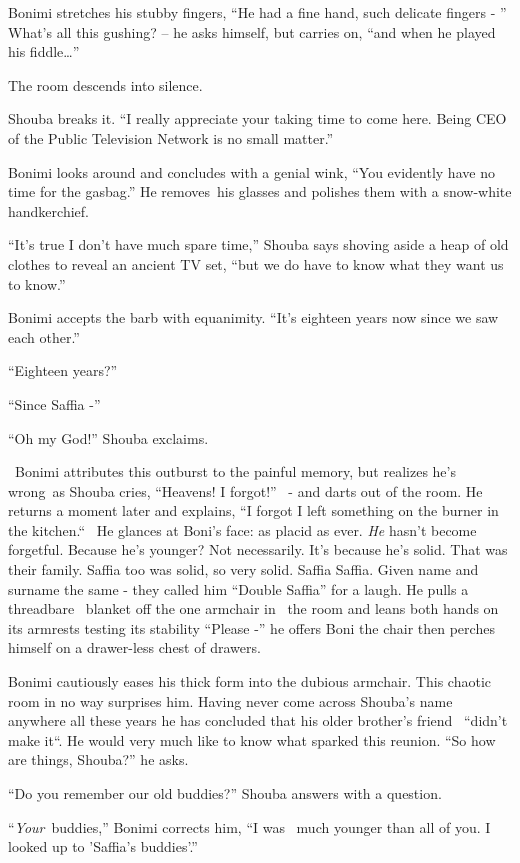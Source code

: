 \documentclass[twoside,11pt]{book}
\begin{document}
Bonimi stretches his stubby fingers, ``He had a fine hand, such delicate fingers - '' What's
all this gushing? -- he asks himself, but carries on, ``and when he played his
fiddle{\dots}''

The room descends into silence.

Shouba breaks it. ``I really appreciate your taking time to come here. Being CEO of the Public Television
Network is no small matter.''

Bonimi looks around and concludes with a genial wink, ``You evidently have no time for the
gasbag.'' He removes~his glasses and polishes them with a snow-white handkerchief.

``It's true I don't have much spare time,'' Shouba says shoving aside a heap of old clothes to
reveal an ancient TV set, ``but we do have to know what they want us to know.''

Bonimi accepts the barb with equanimity. ``It's eighteen years now since we saw each other.''

``Eighteen years?''

``Since Saffia -''

``Oh my God!'' Shouba exclaims.

~Bonimi attributes this outburst to the painful memory, but realizes he's wrong~as Shouba cries,
``Heavens!{ }I forgot!''
{\ }{}- and darts out of the room. He returns a moment later and explains,
``I forgot I left something on the burner in the kitchen.``~ He glances at Boni's face: as
placid as ever. \textit{He} hasn't become forgetful. Because he's younger? Not necessarily. It's because he's solid.
That was their family. Saffia too was solid, so very solid. Saffia Saffia. Given name and surname the same - they
called him ``Double Saffia'' for a laugh. He pulls a threadbare \ blanket off the one
armchair in~ the room and leans both hands on its armrests testing its stability ``Please -''
he offers Boni the chair then perches himself on a drawer-less chest of drawers.

Bonimi cautiously eases his thick form into the dubious armchair. This chaotic room in no way surprises him. Having
never come across Shouba's name anywhere all these years he has concluded that his older brother's friend \ {}``didn't
make it``. He would very much like to know what sparked this reunion. ``So how are things,
Shouba?'' he asks.

``Do you remember our old buddies?'' Shouba answers with a question.

``\textit{Your}~buddies,'' Bonimi corrects him, ``I was ~much younger than all of you. I looked up to
'Saffia's buddies'.''
\end{document}
